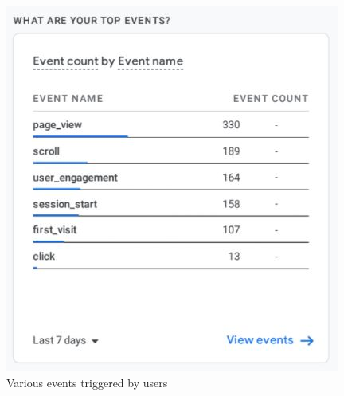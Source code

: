 \begin{figure}[h]
	\begin{center}
		\includegraphics[scale=0.5]{Figures/top-events.JPG}
		\caption{Various events triggered by users}
		\label{fig:rb}
	\end{center}
\end{figure}






